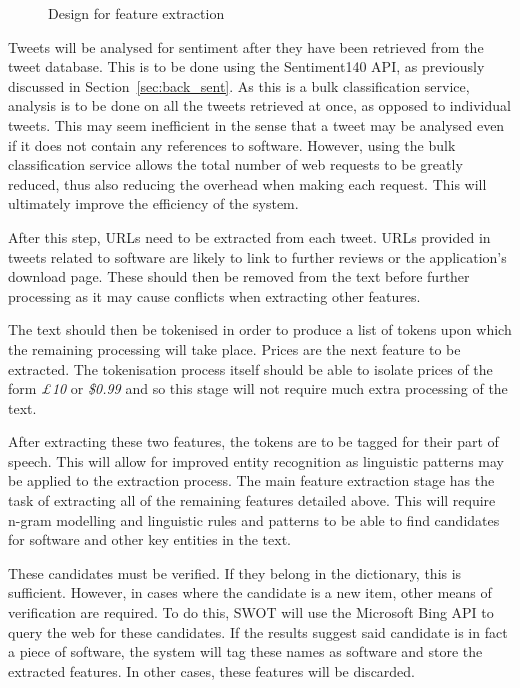 \begin{figure}[h]
  \centering
  
  \caption{Design for feature extraction
    \label{fig:phase2}}
\end{figure}

Tweets will be analysed for sentiment after they have been retrieved from the tweet database. This is to be done using the Sentiment140 API, as previously discussed in Section~\ref{sec:back_sent}. As this is a bulk classification service, analysis is to be done on all the tweets retrieved at once, as opposed to individual tweets. This may seem inefficient in the sense that a tweet may be analysed even if it does not contain any references to software. However, using the bulk classification service allows the total number of web requests to be greatly reduced, thus also reducing the overhead when making each request. This will ultimately improve the efficiency of the system.

After this step, URLs need to be extracted from each tweet. URLs provided in tweets related to software are likely to link to further reviews or the application's download page. These should then be removed from the text before further processing as it may cause conflicts when extracting other features.

The text should then be tokenised in order to produce a list of tokens upon which the remaining processing will take place. Prices are the next feature to be extracted. The tokenisation process itself should be able to isolate prices of the form \emph{£10} or \emph{\$0.99} and so this stage will not require much extra processing of the text.

After extracting these two features, the tokens are to be tagged for their part of speech. This will allow for improved entity recognition as linguistic patterns may be applied to the extraction process. The main feature extraction stage has the task of extracting all of the remaining features detailed above. This will require n-gram modelling and linguistic rules and patterns to be able to find candidates for software and other key entities in the text.

These candidates must be verified. If they belong in the dictionary, this is sufficient. However, in cases where the candidate is a new item, other means of verification are required. To do this, SWOT will use the Microsoft Bing API to query the web for these candidates. If the results suggest said candidate is in fact a piece of software, the system will tag these names as software and store the extracted features. In other cases, these features will be discarded.

